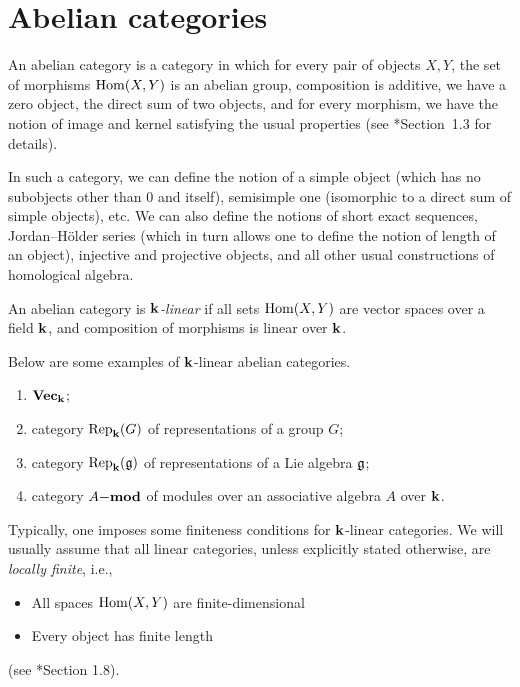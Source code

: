 \section{Abelian categories}\label{s:abelian-cats}
\begin{definition}\label{d:abelian}
  An abelian category is a category in which for every pair of objects $X,Y$,
  the set of morphisms $\Hom(X,Y)$ is an abelian group, composition is
  additive, we have a zero object, the direct sum of two objects, and for every
  morphism, we have the notion of image and kernel satisfying the usual
  properties (see *{Section~1.3} for details).
\end{definition}
In such a category, we can define the notion of a simple object (which has no
subobjects other than $0$ and itself), semisimple one (isomorphic to a direct
sum of simple objects), etc. We can also define the notions of short exact
sequences, Jordan--H\"older series (which in turn allows one to define the
notion of length of an object), injective and projective objects, and all
other usual constructions of homological algebra.

An abelian category is
\emph{$\kk$-linear} if all sets
$\Hom(X,Y)$ are vector spaces over a field $\kk$, and composition of morphisms
is linear over $\kk$.

\begin{example}
  Below are some examples of $\kk$-linear abelian categories.
  \begin{enumerate}
    \item $\vect_\kk$;
    \item category $\Rep_\kk(G)$ of representations of a group $G$;
    \item category $\Rep_\kk(\g)$ of representations of a Lie algebra $\g$;
    \item category $A\mod$ of modules over an associative algebra $A$
      over $\kk$.
  \end{enumerate}
\end{example}

Typically, one imposes some finiteness conditions for $\kk$-linear
categories. We will usually assume that all linear categories, unless
explicitly stated otherwise, are
\emph{locally finite}, i.e.,
\begin{itemize}
  \item All spaces $\Hom(X,Y)$ are finite-dimensional
  \item Every object has finite length
\end{itemize}
(see *{Section 1.8}).

